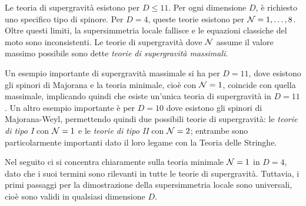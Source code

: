 Le teoria di supergravità esistono per $D \le 11$. Per ogni dimensione $D$, è richiesto uno specifico tipo di spinore. Per $D = 4$, queste teorie esistono per $\mathcal{N} = 1,\dots,8$. Oltre questi limiti, la supersimmetria locale fallisce e le equazioni classiche del moto sono inconsistenti. Le teorie di supergravità dove $\mathcal{N}$ assume il valore massimo possibile sono dette \emph{teorie di supergravità massimali}.
\begin{obs}
    Un esempio importante di supergravità massimale si ha per $D = 11$, dove esistono gli spinori di Majorana e la teoria minimale, cioè con $\mathcal{N} = 1$, coincide con quella massimale, implicando quindi che esiste un'unica teoria di supergravità in $D = 11$. Un altro esempio importante è per $D = 10$ dove esistono gli spinori di Majorana-Weyl, permettendo quindi due possibili teorie di supergravità: le \emph{teorie di tipo I} con $\mathcal{N} = 1$ e le \emph{teorie di tipo II} con $\mathcal{N} = 2$; entrambe sono particolarmente importanti dato il loro legame con la Teoria delle Stringhe. 
\end{obs}

Nel seguito ci si concentra chiaramente sulla teoria minimale $\mathcal{N} = 1$ in $D = 4$, dato che i suoi termini sono rilevanti in tutte le teorie di supergravità. Tuttavia, i primi passaggi per la dimostrazione della supersimmetria locale sono universali, cioè sono validi in qualsiasi dimensione $D$.

